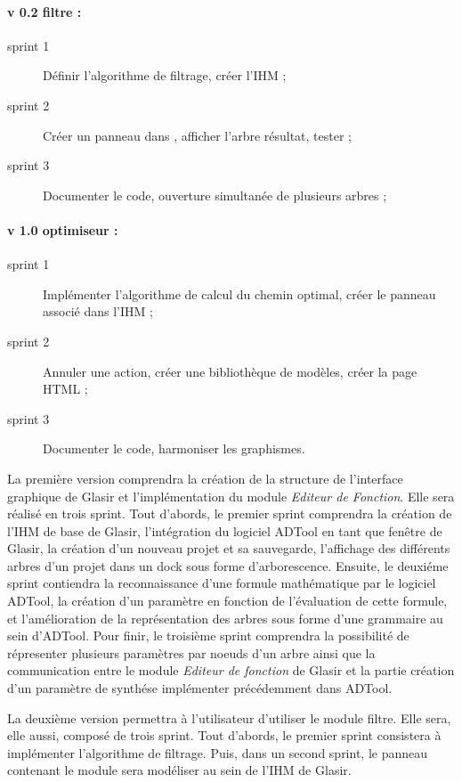 	\paragraph{v 0.2 filtre :} 
		\begin{description}
			\item[sprint 1] Définir l'algorithme de filtrage, créer l'IHM ;
			\item[sprint 2] Créer un panneau dans \glasir{}, afficher l'arbre résultat, tester ;
			\item[sprint 3] Documenter le code, ouverture simultanée de plusieurs arbres ;
		\end{description}
	\paragraph{v 1.0 optimiseur : }
		\begin{description}
			\item[sprint 1] Implémenter l'algorithme de calcul du chemin optimal, créer le panneau associé dans l'IHM ;
			\item[sprint 2] Annuler une action, créer une bibliothèque de modèles, créer la page HTML ;
			\item[sprint 3] Documenter le code, harmoniser les graphismes.
		\end{description}


		La première version comprendra la création de la structure de l'interface graphique de Glasir et l'implémentation du module \emph{Editeur de Fonction}. Elle sera réalisé en trois sprint. Tout d'abords, le premier sprint comprendra la création de l'IHM de base de Glasir, l'intégration du logiciel ADTool en tant que fenêtre de Glasir, la création d'un nouveau projet et sa sauvegarde, l'affichage des différents arbres d'un projet dans un dock sous forme d'arborescence. Ensuite, le deuxiéme sprint contiendra la reconnaissance d'une formule mathématique par le logiciel ADTool, la création d'un paramètre en fonction de l'évaluation de cette formule, et l'amélioration de la représentation des arbres sous forme d'une grammaire au sein d'ADTool. Pour finir, le troisième sprint comprendra la possibilité de répresenter plusieurs paramètres par noeuds d'un arbre ainsi que la communication entre le module \emph{Editeur de fonction} de Glasir et la partie création d'un paramètre de synthése implémenter précédemment dans ADTool. 


		La deuxième version permettra à l'utilisateur d'utiliser le module filtre. Elle sera, elle aussi, composé de trois sprint. Tout d’abords, le premier sprint consistera à implémenter l'algorithme de filtrage. Puis, dans un second sprint, le panneau contenant le module sera modéliser au sein de l'IHM de Glasir. 

